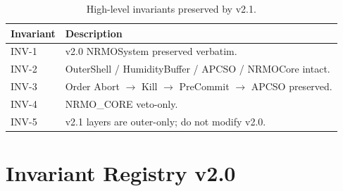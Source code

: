 \begin{table}[ht]
\centering
\small
\begin{tabularx}{\linewidth}{lX}
\toprule
\textbf{Invariant} & \textbf{Description} \\
\midrule
INV-1 & v2.0 NRMOSystem preserved verbatim. \\
INV-2 & OuterShell / HumidityBuffer / APCSO / NRMOCore intact. \\
INV-3 & Order Abort $\to$ Kill $\to$ PreCommit $\to$ APCSO
preserved. \\
INV-4 & NRMO\_CORE veto-only. \\
INV-5 & v2.1 layers are outer-only; do not modify v2.0. \\
\bottomrule
\end{tabularx}
\caption[v2.1 invariant preservation]{High-level invariants
preserved by v2.1.}
\label{tab:v21-invariant-preservation}
\end{table}

\section{Invariant Registry v2.0}
\label{sec:v20-invariant-registry}

